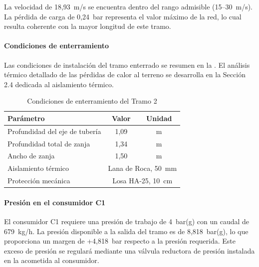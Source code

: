 \documentclass[12pt]{article}
\begin{document}
La velocidad de 18{,}93~m/s se encuentra dentro del rango admisible (15--30~m/s). La pérdida de carga de 0{,}24~bar representa el valor máximo de la red, lo cual resulta coherente con la mayor longitud de este tramo.

\paragraph{Condiciones de enterramiento}

Las condiciones de instalación del tramo enterrado se resumen en la . El análisis térmico detallado de las pérdidas de calor al terreno se desarrolla en la Sección 2.4 dedicada al aislamiento térmico.

\begin{table}[H]
	\centering
	\caption{Condiciones de enterramiento del Tramo 2}
	\label{tab:enterramiento-tramo2}
	\begin{tabular}{lcc}
		\toprule
		\textbf{Parámetro}             & \textbf{Valor}                          & \textbf{Unidad} \\
		\midrule
		Profundidad del eje de tubería & 1{,}09                                  & m               \\
		Profundidad total de zanja     & 1{,}34                                  & m               \\
		Ancho de zanja                 & 1{,}50                                  & m               \\
		Aislamiento térmico            & \multicolumn{2}{c}{Lana de Roca, 50~mm}                   \\
		Protección mecánica            & \multicolumn{2}{c}{Losa HA-25, 10~cm}                     \\
		\bottomrule
	\end{tabular}
\end{table}

\paragraph{Presión en el consumidor C1}

El consumidor C1 requiere una presión de trabajo de 4~bar(g) con un caudal de 679~kg/h. La presión disponible a la salida del tramo es de 8{,}818~bar(g), lo que proporciona un margen de +4{,}818~bar respecto a la presión requerida. Este exceso de presión se regulará mediante una válvula reductora de presión instalada en la acometida al consumidor.
\end{document}
